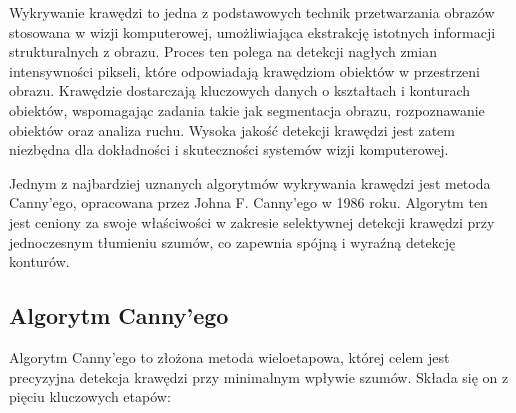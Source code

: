 Wykrywanie krawędzi to jedna z podstawowych technik przetwarzania obrazów stosowana w wizji komputerowej, umożliwiająca ekstrakcję istotnych informacji strukturalnych z obrazu. Proces ten polega na detekcji nagłych zmian intensywności pikseli, które odpowiadają krawędziom obiektów w przestrzeni obrazu. Krawędzie dostarczają kluczowych danych o kształtach i konturach obiektów, wspomagając zadania takie jak segmentacja obrazu, rozpoznawanie obiektów oraz analiza ruchu. Wysoka jakość detekcji krawędzi jest zatem niezbędna dla dokładności i skuteczności systemów wizji komputerowej.

Jednym z najbardziej uznanych algorytmów wykrywania krawędzi jest metoda Canny'ego, opracowana przez Johna F. Canny’ego w 1986 roku. Algorytm ten jest ceniony za swoje właściwości w zakresie selektywnej detekcji krawędzi przy jednoczesnym tłumieniu szumów, co zapewnia spójną i wyraźną detekcję konturów.

\subsection{Algorytm Canny’ego}

Algorytm Canny’ego \cite{bib:canny-article} to złożona metoda wieloetapowa, której celem jest precyzyjna detekcja krawędzi przy minimalnym wpływie szumów. Składa się on z pięciu kluczowych etapów:

